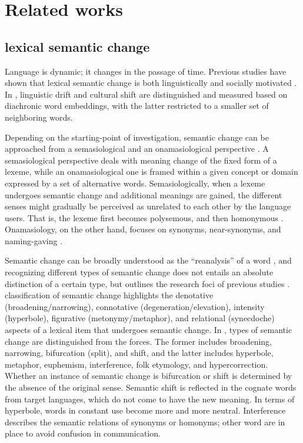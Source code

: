     

\chapter{Related works}
\label{related_works}

\section{lexical semantic change}
Language is dynamic; it changes in the passage of time. Previous studies have shown that lexical semantic change is both linguistically and socially motivated \parencite{kutuzov2017tracing,kutuzov2018survey,hamilton2016cultural}. In \textcite{hamilton2016cultural}, linguistic drift and cultural shift are distinguished and measured based on diachronic word embeddings, with the latter restricted to a smaller set of neighboring words.

Depending on the starting-point of investigation, semantic change can be approached from a semasiological and an onamasiological perspective \parencites[17]{geeraerts1997diachronic}[25]{traugott2001regularity}. A semasiological perspective deals with meaning change of the fixed form of a lexeme, while an onamasiological one is framed within a given concept or domain expressed by a set of alternative words. Semasiologically, when a lexeme undergoes semantic change and additional meanings are gained, the different senses might gradually be perceived as unrelated to each other by the language users. That is, the lexeme first becomes polysemous, and then homonymous \parencite[25]{traugott2001regularity}. Onamasiology, on the other hand, focuses on synonyms, near-synonyms, and naming-gaving \parencite[17]{geeraerts1997diachronic}.

Semantic change can be broadly understood as the ``reanalysis'' of a word \parencite[650]{fortson2017approach}, and recognizing different types of semantic change does not entails an absolute distinction of a certain type, but outlines the research foci of previous studies \parencites[650]{fortson2017approach}{traugott2017semantic}. \textcite{bloomfield1933language} classification of semantic change highlights the denotative (broadening/narrowing), connotative (degeneration/elevation), intensity (hyperbole), figurative (metonymy/metaphor), and relational (synecdoche) aspects of a lexical item that undergoes semantic change. In \textcite[199-205]{semanticincrowley2010}, types of semantic change are distinguished from the forces. The former includes broadening, narrowing, bifurcation (split), and shift, and the latter includes hyperbole, metaphor, euphemism, interference, folk etymology, and hypercorrection. Whether an instance of semantic change is bifurcation or shift is determined by the absence of the original sense. Semantic shift is reflected in the cognate words from target languages, which do not come to have the new meaning. In terms of hyperbole, words in constant use become more and more neutral. Interference describes the semantic relations of synonyms or homonyms; other word are in place to avoid confusion in communication.

